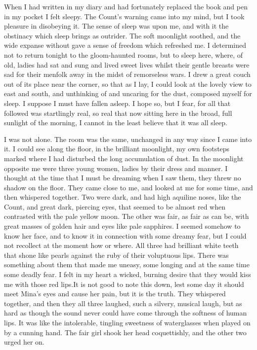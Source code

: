 When I had written in my diary and had fortunately replaced the book and pen in my pocket I felt sleepy. The Count's warning came into my mind, but I took pleasure in disobeying it. The sense of sleep was upon me, and with it the obstinacy which sleep brings as outrider. The soft moonlight soothed, and the wide expanse without gave a sense of freedom which refreshed me. I determined not to return tonight to the gloom-haunted rooms, but to sleep here, where, of old, ladies had sat and sung and lived sweet lives whilst their gentle breasts were sad for their menfolk away in the midst of remorseless wars. I drew a great couch out of its place near the corner, so that as I lay, I could look at the lovely view to east and south, and unthinking of and uncaring for the dust, composed myself for sleep. I suppose I must have fallen asleep. I hope so, but I fear, for all that followed was startlingly real, so real that now sitting here in the broad, full sunlight of the morning, I cannot in the least believe that it was all sleep. 

I was not alone. The room was the same, unchanged in any way since I came into it. I could see along the floor, in the brilliant moonlight, my own footsteps marked where I had disturbed the long accumulation of dust. In the moonlight opposite me were three young women, ladies by their dress and manner. I thought at the time that I must be dreaming when I saw them, they threw no shadow on the floor. They came close to me, and looked at me for some time, and then whispered together. Two were dark, and had high aquiline noses, like the Count, and great dark, piercing eyes, that seemed to be almost red when contrasted with the pale yellow moon. The other was fair, as fair as can be, with great masses of golden hair and eyes like pale sapphires. I seemed somehow to know her face, and to know it in connection with some dreamy fear, but I could not recollect at the moment how or where. All three had brilliant white teeth that shone like pearls against the ruby of their voluptuous lips. There was something about them that made me uneasy, some longing and at the same time some deadly fear. I felt in my heart a wicked, burning desire that they would kiss me with those red lips.It is not good to note this down, lest some day it should meet Mina's eyes and cause her pain, but it is the truth. They whispered together, and then they all three laughed, such a silvery, musical laugh, but as hard as though the sound never could have come through the softness of human lips. It was like the intolerable, tingling sweetness of waterglasses when played on by a cunning hand. The fair girl shook her head coquettishly, and the other two urged her on. 

